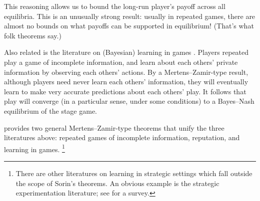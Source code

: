 \documentclass[11pt,letterpaper,reqno,oneside]{article}
\begin{document}
This reasoning allows us to bound the long-run player's payoff across all equilibria. This is an unusually strong result: usually in repeated games, there are almost no bounds on what payoffs can be supported in equilibrium! (That's what folk theorems say.)


Also related is the literature on (Bayesian) learning in games \textcite{KalaiLehrer1993}. Players repeated play a game of incomplete information, and learn about each others' private information by observing each others' actions. By a Mertens--Zamir-type result, although players need never learn each others' information, they will eventually learn to make very accurate predictions about each others' play. It follows that play will converge (in a particular sense, under some conditions) to a Bayes--Nash equilibrium of the stage game.


\textcite{Sorin1999} provides two general Mertens--Zamir-type theorems that unify the three literatures above: repeated games of incomplete information, reputation, and learning in games.%
	\footnote{There are other literatures on learning in strategic settings which fall outside the scope of Sorin's theorems. An obvious example is the strategic experimentation literature; see \textcite{HornerSkrzypacz2016} for a survey.}





















\pagebreak
\printbibliography[heading=bibintoc]



\end{document}
